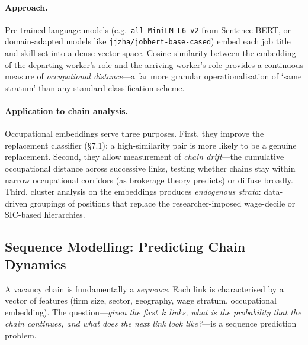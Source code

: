 \documentclass[a4paper]{tufte-handout}
\begin{document}
\paragraph{Approach.}
Pre-trained language models (e.g.\ \texttt{all-MiniLM-L6-v2} from Sentence-BERT, or domain-adapted models like \texttt{jjzha/jobbert-base-cased}) embed each job title and skill set into a dense vector space.
Cosine similarity between the embedding of the departing worker's role and the arriving worker's role provides a continuous measure of \emph{occupational distance}---a far more granular operationalisation of `same stratum' than any standard classification scheme.

\paragraph{Application to chain analysis.}
Occupational embeddings serve three purposes. First, they improve the replacement classifier (§7.1): a high-similarity pair is more likely to be a genuine replacement. Second, they allow measurement of \emph{chain drift}---the cumulative occupational distance across successive links, testing whether chains stay within narrow occupational corridors (as brokerage theory predicts) or diffuse broadly. Third, cluster analysis on the embeddings produces \emph{endogenous strata}: data-driven groupings of positions that replace the researcher-imposed wage-decile or SIC-based hierarchies.


\subsection{Sequence Modelling: Predicting Chain Dynamics}

A vacancy chain is fundamentally a \emph{sequence}. Each link is characterised by a vector of features (firm size, sector, geography, wage stratum, occupational embedding). The question---\emph{given the first~$k$ links, what is the probability that the chain continues, and what does the next link look like?}---is a sequence prediction problem.
\end{document}
